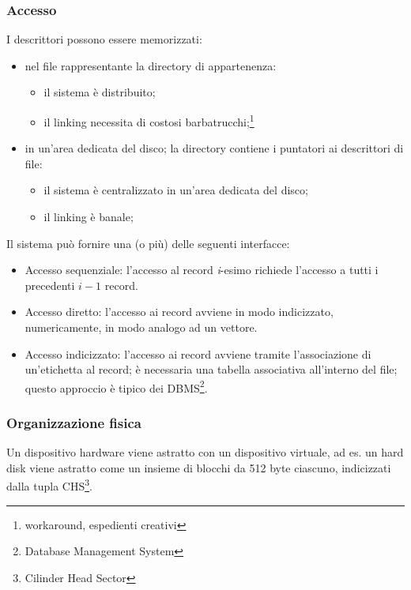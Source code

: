 \documentclass[12pt,a4paper]{article}
\begin{document}
\subsubsection{Accesso}
I descrittori possono essere memorizzati:
\begin{itemize}
  \item nel file rappresentante la directory di appartenenza:
  \begin{itemize}
    \item il sistema è distribuito;
    \item il linking necessita di costosi
      barbatrucchi;\footnote{workaround, espedienti creativi}
  \end{itemize}
  \item in un'area dedicata del disco; la directory contiene i puntatori
    ai descrittori di file:
  \begin{itemize}
    \item il sistema è centralizzato in un'area dedicata del disco;
    \item il linking è banale;
  \end{itemize}
\end{itemize}

Il sistema può fornire una (o più) delle seguenti interfacce:
\begin{itemize}
  \item Accesso sequenziale: l'accesso al record \emph{i}-esimo
  richiede l'accesso a tutti i precedenti $ i - 1 $ record.
  \item Accesso diretto: l'accesso ai record avviene in modo
  indicizzato, numericamente, in modo analogo ad un vettore.
  \item Accesso indicizzato: l'accesso ai record avviene tramite
  l'associazione di un'etichetta al record; è necessaria una tabella
  associativa all'interno del file; questo approccio è tipico
  dei DBMS\footnote{Database Management System}.
\end{itemize}

\subsubsection{Organizzazione fisica}
Un dispositivo hardware viene astratto con un dispositivo
virtuale, ad es. un hard disk viene astratto come un insieme di blocchi
da 512 byte ciascuno, indicizzati dalla tupla
CHS\footnote{Cilinder Head Sector}.
\end{document}
